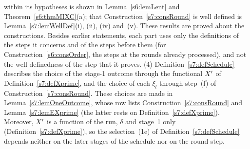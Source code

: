 within its hypotheses is shown in Lemma~\ref{s6:lemLent} and
Theorem~\ref{s6:thmMIXC}(a); that Construction~\ref{s7:consRound} is well defined
is Lemma~\ref{s7:lemWellDef}(i), (ii), (iv) and~(v). These results are proved
about the constructions. Besides earlier statements, each part uses only the
definitions of the steps it concerns and of the steps before them (for
Construction~\ref{s6:consOrder}, the steps at the rounds already processed), and
not the well-definedness of the step that it proves.
(4) Definition~\ref{s7:defSchedule} describes the choice of the stage-1 outcome
through the functional $X'$ of Definition~\ref{s7:defXprime}, and the choice of
each $\xi_l$ through step~(f) of Construction~\ref{s7:consRound}. These choices
are made in Lemma~\ref{s7:lemOneOutcome}, whose row lists
Construction~\ref{s7:consRound} and Lemma~\ref{s7:lemEXprime} (the latter rests
on Definition~\ref{s7:defXprime}). Moreover, $X'$ is a function of the run,
$\delta$ and stage~1 only (Definition~\ref{s7:defXprime}), so the selection~(1e)
of Definition~\ref{s7:defSchedule} depends neither on the later stages of the
schedule nor on the round step.

